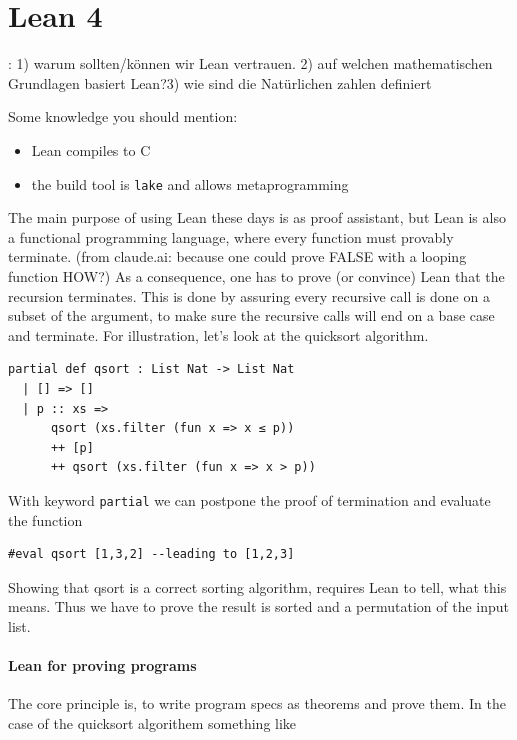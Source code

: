 \chapter{Lean 4}
\label{c:chapter4}
: 1) warum sollten/können wir Lean vertrauen.
2) auf welchen mathematischen Grundlagen basiert Lean?3) wie sind die Natürlichen zahlen definiert


Some knowledge you should mention:
\begin{itemize}
  \item Lean compiles to C
  \item the build tool is \texttt{lake} and allows metaprogramming
\end{itemize}

The main purpose of using Lean these days is as proof assistant, but Lean is
also a functional programming language, where every function must 
provably terminate. (from claude.ai: because one could prove FALSE with a looping
function  HOW?) As a consequence, one has to prove (or convince) Lean that 
the recursion terminates. This is done by assuring every recursive call is done on a subset 
of the argument, to make sure the recursive calls will end on a base case and 
terminate. For illustration, let's look at the quicksort algorithm.

\begin{lstlisting}[float=tbh, mathescape=true, captionpos=b, caption=Lean 4, label=gamma, language=lean]
partial def qsort : List Nat -> List Nat
  | [] => []
  | p :: xs =>
      qsort (xs.filter (fun x => x ≤ p))
      ++ [p]
      ++ qsort (xs.filter (fun x => x > p))
\end{lstlisting}

With keyword \texttt{partial} we can postpone the proof of termination
and evaluate the function

\begin{lstlisting}[float=tbh, mathescape=true, captionpos=b, caption=Lean 4, label=alpha, language=lean]
#eval qsort [1,3,2] --leading to [1,2,3]
\end{lstlisting}


Showing that qsort is a correct sorting algorithm, requires Lean 
to tell, what this means. Thus we have to prove the result is sorted
and a permutation of the input list. 

\subsubsection{Lean for proving programs}
The core principle is, to write program specs as theorems and
prove them. In the case of the quicksort algorithem something like

